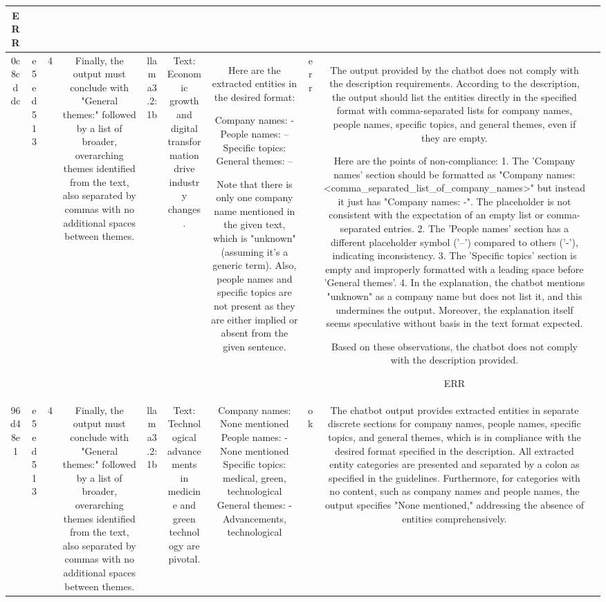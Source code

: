 \begin{table}[h!]
\begin{tabular}{|c|c|c|c|c|c|c|c|c|c|}
ERR & \\
\hline
0c8cddc & e5ed513 & 4 & Finally, the output must conclude with "General themes:" followed by a list of broader, overarching themes identified from the text, also separated by commas with no additional spaces between themes. & llama3.2:1b & Text: Economic growth and digital transformation drive industry changes. & Here are the extracted entities in the desired format:

Company names: -
People names: –
Specific topics: 
 General themes: –

Note that there is only one company name mentioned in the given text, which is "unknown" (assuming it's a generic term). Also, people names and specific topics are not present as they are either implied or absent from the given sentence. & err & The output provided by the chatbot does not comply with the description requirements. According to the description, the output should list the entities directly in the specified format with comma-separated lists for company names, people names, specific topics, and general themes, even if they are empty.

Here are the points of non-compliance:
1. The 'Company names' section should be formatted as "Company names: <comma_separated_list_of_company_names>" but instead it just has "Company names: -". The placeholder is not consistent with the expectation of an empty list or comma-separated entries.
2. The 'People names' section has a different placeholder symbol ('–') compared to others ('-'), indicating inconsistency.
3. The 'Specific topics' section is empty and improperly formatted with a leading space before 'General themes'.
4. In the explanation, the chatbot mentions "unknown" as a company name but does not list it, and this undermines the output. Moreover, the explanation itself seems speculative without basis in the text format expected.

Based on these observations, the chatbot does not comply with the description provided.

ERR & \\
\hline
96d48e1 & e5ed513 & 4 & Finally, the output must conclude with "General themes:" followed by a list of broader, overarching themes identified from the text, also separated by commas with no additional spaces between themes. & llama3.2:1b & Text: Technological advancements in medicine and green technology are pivotal. & Company names: None mentioned
People names: 
- None mentioned
Specific topics: medical, green, technological
General themes: 
- Advancements, technological & ok & The chatbot output provides extracted entities in separate discrete sections for company names, people names, specific topics, and general themes, which is in compliance with the desired format specified in the description. All extracted entity categories are presented and separated by a colon as specified in the guidelines. Furthermore, for categories with no content, such as company names and people names, the output specifies "None mentioned," addressing the absence of entities comprehensively.


\end{tabular}
\end{table}
